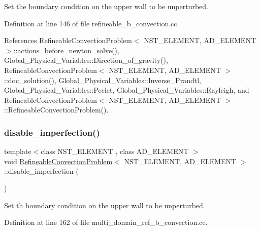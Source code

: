 Set the boundary condition on the upper wall to be unperturbed. 



Definition at line 146 of file refineable\+\_\+b\+\_\+convection.\+cc.



References Refineable\+Convection\+Problem$<$ N\+S\+T\+\_\+\+E\+L\+E\+M\+E\+N\+T, A\+D\+\_\+\+E\+L\+E\+M\+E\+N\+T $>$\+::actions\+\_\+before\+\_\+newton\+\_\+solve(), Global\+\_\+\+Physical\+\_\+\+Variables\+::\+Direction\+\_\+of\+\_\+gravity(), Refineable\+Convection\+Problem$<$ N\+S\+T\+\_\+\+E\+L\+E\+M\+E\+N\+T, A\+D\+\_\+\+E\+L\+E\+M\+E\+N\+T $>$\+::doc\+\_\+solution(), Global\+\_\+\+Physical\+\_\+\+Variables\+::\+Inverse\+\_\+\+Prandtl, Global\+\_\+\+Physical\+\_\+\+Variables\+::\+Peclet, Global\+\_\+\+Physical\+\_\+\+Variables\+::\+Rayleigh, and Refineable\+Convection\+Problem$<$ N\+S\+T\+\_\+\+E\+L\+E\+M\+E\+N\+T, A\+D\+\_\+\+E\+L\+E\+M\+E\+N\+T $>$\+::\+Refineable\+Convection\+Problem().

\mbox{\label{classRefineableConvectionProblem_a816f49163ff3ceb71aec4236aac10d84}} 
\subsubsection{\texorpdfstring{disable\+\_\+imperfection()}{disable\_imperfection()}\hspace{0.1cm}{\footnotesize\ttfamily [2/2]}}
{\footnotesize\ttfamily template$<$class N\+S\+T\+\_\+\+E\+L\+E\+M\+E\+NT , class A\+D\+\_\+\+E\+L\+E\+M\+E\+NT $>$ \\
void \hyperlink{classRefineableConvectionProblem}{Refineable\+Convection\+Problem}$<$ N\+S\+T\+\_\+\+E\+L\+E\+M\+E\+NT, A\+D\+\_\+\+E\+L\+E\+M\+E\+NT $>$\+::disable\+\_\+imperfection (\begin{DoxyParamCaption}{ }\end{DoxyParamCaption})\hspace{0.3cm}{\ttfamily [inline]}}



Set th boundary condition on the upper wall to be unperturbed. 



Definition at line 162 of file multi\+\_\+domain\+\_\+ref\+\_\+b\+\_\+convection.\+cc.

